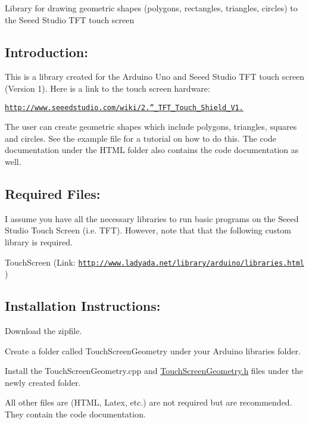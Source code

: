 Library for drawing geometric shapes (polygons, rectangles, triangles, circles) to the Seeed Studio T\+F\+T touch screen

\subsection*{Introduction\+:}

This is a library created for the Arduino Uno and Seeed Studio T\+F\+T touch screen (Version 1). Here is a link to the touch screen hardware\+:

\href{http://www.seeedstudio.com/wiki/2.8''_TFT_Touch_Shield_V1.0}{\tt http\+://www.\+seeedstudio.\+com/wiki/2.''\+\_\+\+T\+F\+T\+\_\+\+Touch\+\_\+\+Shield\+\_\+\+V1.}

The user can create geometric shapes which include polygons, triangles, squares and circles. See the example file for a tutorial on how to do this. The code documentation under the H\+T\+M\+L folder also contains the code documentation as well.

\subsection*{Required Files\+:}

I assume you have all the necessary libraries to run basic programs on the Seeed Studio Touch Screen (i.\+e. T\+F\+T). However, note that that the following custom library is required.


\begin{DoxyEnumerate}
\item Touch\+Screen (Link\+: \href{http://www.ladyada.net/library/arduino/libraries.html}{\tt http\+://www.\+ladyada.\+net/library/arduino/libraries.\+html} )
\end{DoxyEnumerate}

\subsection*{Installation Instructions\+:}


\begin{DoxyEnumerate}
\item Download the zipfile.
\item Create a folder called Touch\+Screen\+Geometry under your Arduino libraries folder.
\item Install the Touch\+Screen\+Geometry.\+cpp and \hyperlink{_touch_screen_geometry_8h}{Touch\+Screen\+Geometry.\+h} files under the newly created folder.
\item All other files are (H\+T\+M\+L, Latex, etc.) are not required but are recommended. They contain the code documentation.
\end{DoxyEnumerate}

